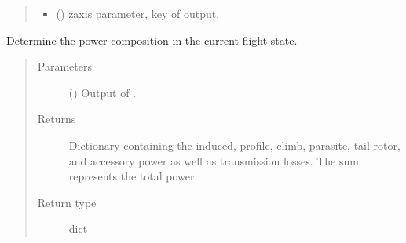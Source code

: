 \documentclass[letterpaper,10pt,english]{sphinxmanual}
\begin{document}
\begin{fulllineitems}
\begin{fulllineitems}
\begin{quote}
\begin{description}
\begin{itemize}
\item {} 
\sphinxAtStartPar
{} () \textendash{} z\sphinxhyphen{}axis parameter, key of {\hyperref[\detokenize{modules/helicopter:helicopter.Helicopter.sizing_loop}]{}} output.

\end{itemize}

\end{description}\end{quote}

\end{fulllineitems}


\begin{fulllineitems}
\label{\detokenize{modules/helicopter:helicopter.Helicopter.powers}}
\sphinxAtStartPar
Determine the power composition in the current flight state.
\begin{quote}\begin{description}
\item[{Parameters}] \leavevmode
\sphinxAtStartPar
{} () \textendash{} Output of {\hyperref[\detokenize{modules/helicopter:helicopter.Helicopter.flight_state}]{}}.

\item[{Returns}] \leavevmode
\sphinxAtStartPar
Dictionary containing the induced, profile, climb, parasite, tail
rotor, and accessory power as well as transmission losses. The sum
represents the total power.

\item[{Return type}] \leavevmode
\sphinxAtStartPar
dict

\end{description}\end{quote}

\end{fulllineitems}



\end{fulllineitems}
\end{document}
